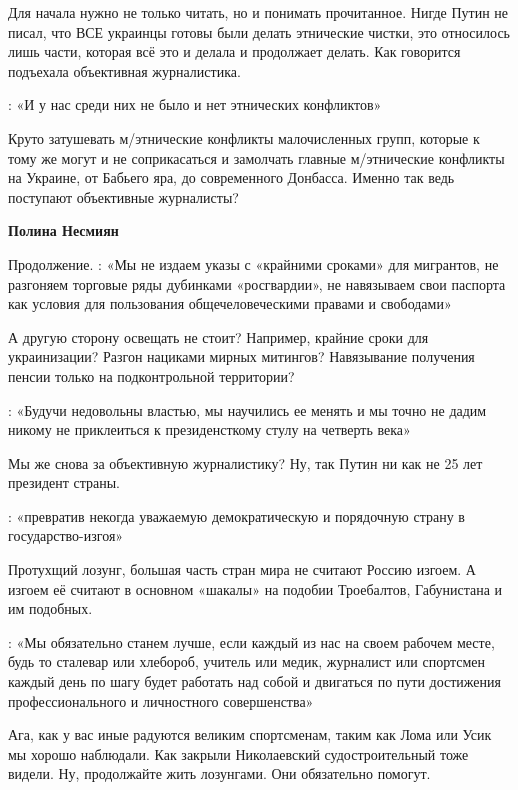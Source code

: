 \begin{itemize}
\begin{itemize}
Для начала нужно не только читать, но и понимать прочитанное. Нигде Путин не
писал, что ВСЕ украинцы готовы были делать этнические чистки, это относилось
лишь части, которая всё это и делала и продолжает делать. Как говорится
подъехала объективная журналистика.

: «И у нас среди них не было и нет этнических конфликтов»

Круто затушевать м/этнические конфликты малочисленных групп, которые к тому же
могут и не соприкасаться и замолчать главные м/этнические конфликты на Украине,
от Бабьего яра, до современного Донбасса. Именно так ведь поступают объективные
журналисты?

 
\textbf{Полина Несмиян} 

Продолжение. : «Мы не издаем указы с «крайними сроками» для мигрантов, не
разгоняем торговые ряды дубинками «росгвардии», не навязываем свои паспорта как
условия для пользования общечеловеческими правами и свободами»

А другую сторону освещать не стоит? Например, крайние сроки для украинизации?
Разгон нациками мирных митингов? Навязывание получения пенсии только на
подконтрольной территории?

: «Будучи недовольны властью, мы научились ее менять и мы точно не дадим никому
не приклеиться к президенсткому стулу на четверть века»

Мы же снова за объективную журналистику? Ну, так Путин ни как не 25 лет
президент страны.

: «превратив некогда уважаемую демократическую и порядочную страну в государство-изгоя»

Протухщий лозунг, большая часть стран мира не считают Россию изгоем. А изгоем
её считают в основном «шакалы» на подобии Троебалтов, Габунистана и им
подобных.

: «Мы обязательно станем лучше, если каждый из нас на своем рабочем месте, будь
то сталевар или хлебороб, учитель или медик, журналист или спортсмен каждый
день по шагу будет работать над собой и двигаться по пути достижения
профессионального и личностного совершенства»

Ага, как у вас иные радуются великим спортсменам, таким как Лома или Усик мы
хорошо наблюдали. Как закрыли Николаевский судостроительный тоже видели. Ну,
продолжайте жить лозунгами. Они обязательно помогут.


\end{itemize}
\end{itemize}
